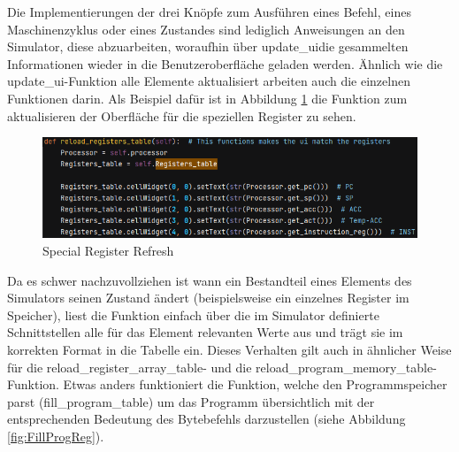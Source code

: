 \documentclass[12pt]{article}
\newcommand{\imgSpaceBefore}{\vspace{10pt}}
\begin{document}
\noindent
Die Implementierungen der drei Knöpfe zum Ausführen eines Befehl, eines Maschinenzyklus oder eines Zustandes sind lediglich Anweisungen an den Simulator, diese abzuarbeiten, woraufhin über \glqq update\_ui\grqq die gesammelten Informationen wieder in die Benutzeroberfläche geladen werden. Ähnlich wie die \glqq update\_ui\grqq-Funktion alle Elemente aktualisiert arbeiten auch die einzelnen Funktionen darin. Als Beispiel dafür ist in Abbildung \ref{fig:reloadRegs} die Funktion zum aktualisieren der Oberfläche für die speziellen Register zu sehen.\imgSpaceBefore

\begin{figure}[H]
\centering
\includegraphics[width=14cm]{bilder/reloadRegs}
\caption{Special Register Refresh}
\label{fig:reloadRegs}
\end{figure}

\noindent
Da es schwer nachzuvollziehen ist wann ein Bestandteil eines Elements des Simulators seinen Zustand ändert (beispielsweise ein einzelnes Register im Speicher), liest die Funktion einfach über die im Simulator definierte Schnittstellen alle für das Element relevanten Werte aus und trägt sie im korrekten Format in die Tabelle ein. Dieses Verhalten gilt auch in ähnlicher Weise für die \glqq reload\_register\_array\_table\grqq- und die \glqq reload\_program\_memory\_table\grqq-Funktion. Etwas anders funktioniert die Funktion, welche den Programmspeicher parst (\glqq fill\_program\_table\grqq) um das Programm übersichtlich mit der entsprechenden Bedeutung des Bytebefehls darzustellen (siehe Abbildung \ref{fig:FillProgReg}).\imgSpaceBefore
\end{document}
